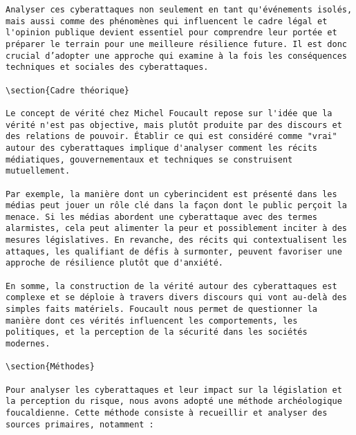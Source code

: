 \documentclass{article}
\begin{document}
\begin{verbatim}
Analyser ces cyberattaques non seulement en tant qu'événements isolés, mais aussi comme des phénomènes qui influencent le cadre légal et l'opinion publique devient essentiel pour comprendre leur portée et préparer le terrain pour une meilleure résilience future. Il est donc crucial d’adopter une approche qui examine à la fois les conséquences techniques et sociales des cyberattaques.

\section{Cadre théorique}

Le concept de vérité chez Michel Foucault repose sur l'idée que la vérité n'est pas objective, mais plutôt produite par des discours et des relations de pouvoir. Établir ce qui est considéré comme "vrai" autour des cyberattaques implique d'analyser comment les récits médiatiques, gouvernementaux et techniques se construisent mutuellement.

Par exemple, la manière dont un cyberincident est présenté dans les médias peut jouer un rôle clé dans la façon dont le public perçoit la menace. Si les médias abordent une cyberattaque avec des termes alarmistes, cela peut alimenter la peur et possiblement inciter à des mesures législatives. En revanche, des récits qui contextualisent les attaques, les qualifiant de défis à surmonter, peuvent favoriser une approche de résilience plutôt que d'anxiété.

En somme, la construction de la vérité autour des cyberattaques est complexe et se déploie à travers divers discours qui vont au-delà des simples faits matériels. Foucault nous permet de questionner la manière dont ces vérités influencent les comportements, les politiques, et la perception de la sécurité dans les sociétés modernes.

\section{Méthodes}

Pour analyser les cyberattaques et leur impact sur la législation et la perception du risque, nous avons adopté une méthode archéologique foucaldienne. Cette méthode consiste à recueillir et analyser des sources primaires, notamment :


\end{verbatim}
\end{document}
